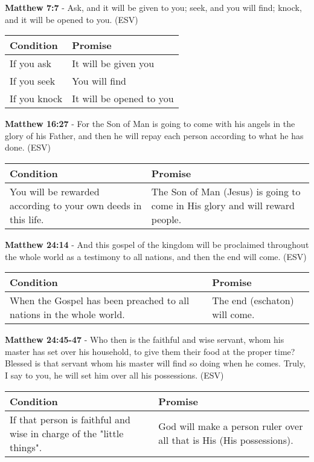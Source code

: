 \documentclass[11pt]{article}
\begin{document}
\textbf{Matthew 7:7} - Ask, and it will be given to you; seek, and you will find; knock, and it will be opened to you. (ESV)

\begin{center}
\begin{tabular}{ll}
Condition & Promise\\[0pt]
\hline
If you ask & It will be given you\\[0pt]
If you seek & You will find\\[0pt]
If you knock & It will be opened to you\\[0pt]
\end{tabular}
\end{center}

\textbf{Matthew 16:27} - For the Son of Man is going to come with his angels in the glory of his Father, and then he will repay each person according to what he has done. (ESV)

\begin{center}
\begin{tabular}{ll}
Condition & Promise\\[0pt]
\hline
You will be rewarded according to your own deeds in this life. & The Son of Man (Jesus) is going to come in His glory and will reward people.\\[0pt]
\end{tabular}
\end{center}

\textbf{Matthew 24:14} - And this gospel of the kingdom will be proclaimed throughout the whole world as a testimony to all nations, and then the end will come. (ESV)

\begin{center}
\begin{tabular}{ll}
Condition & Promise\\[0pt]
\hline
When the Gospel has been preached to all nations in the whole world. & The end (eschaton) will come.\\[0pt]
\end{tabular}
\end{center}

\textbf{Matthew 24:45-47} - Who then is the faithful and wise servant, whom his master has set over his household, to give them their food at the proper time? Blessed is that servant whom his master will find so doing when he comes. Truly, I say to you, he will set him over all his possessions. (ESV)

\begin{center}
\begin{tabular}{ll}
Condition & Promise\\[0pt]
\hline
If that person is faithful and wise in charge of the "little things". & God will make a person ruler over all that is His (His possessions).\\[0pt]
\end{tabular}
\end{center}
\end{document}
